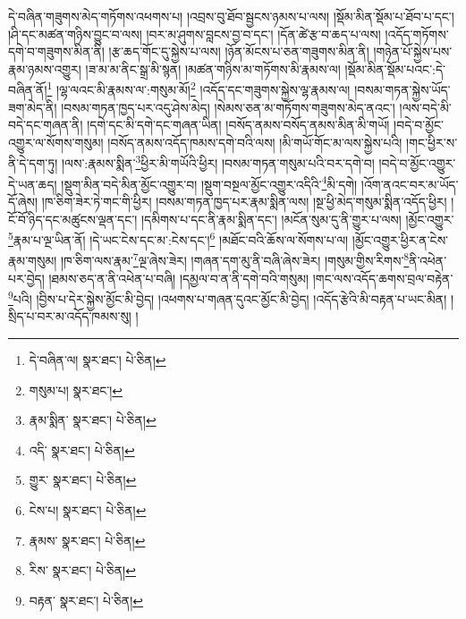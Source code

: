 དེ་བཞིན་གཟུགས་མེད་གཏོགས་འཕགས་པ། །འབྲས་བུ་ཐོབ་སྦྱངས་ཉམས་པ་ལས། །སྡོམ་མིན་སྡོམ་པ་ཐོབ་པ་དང་། །ཤི་དང་མཚན་གཉིས་བྱུང་བ་ལས། །བར་མ་ཤུགས་བླངས་བྱ་བ་དང་། །དོན་ཚེ་རྩ་བ་ཆད་པ་ལས། །འདོད་གཏོགས་དགེ་བ་གཟུགས་མིན་ནི། །རྩ་ཆད་གོང་དུ་སྐྱེས་པ་ལས། །ཉོན་མོངས་པ་ཅན་གཟུགས་མིན་ནི། །གཉེན་པོ་སྐྱེས་པས་རྣམ་ཉམས་འགྱུར། །ཟ་མ་མ་ནིང་སྒྲ་མི་སྙན། །མཚན་གཉིས་མ་གཏོགས་མི་རྣམས་ལ། །སྡོམ་མིན་སྡོམ་པའང་:དེ་བཞིན་ནོ།\footnote{དེ་བཞིན་ལ།  སྣར་ཐང་།  པེ་ཅིན། } །ལྷ་ལའང་མི་རྣམས་ལ་:གསུམ་མོ།\footnote{གསུམ་པ།  སྣར་ཐང་། } །འདོད་དང་གཟུགས་སྐྱེས་ལྷ་རྣམས་ལ། །བསམ་གཏན་སྐྱེས་ཡོད་ཟག་མེད་ནི། །བསམ་གཏན་ཁྱད་པར་འདུ་ཤེས་མེད། །སེམས་ཅན་མ་གཏོགས་གཟུགས་མེད་ནའང་། །ལས་བདེ་མི་བདེ་དང་གཞན་ནི། །དགེ་དང་མི་དགེ་དང་གཞན་ཡིན། །བསོད་ནམས་བསོད་ནམས་མིན་མི་གཡོ། །བདེ་བ་མྱོང་འགྱུར་ལ་སོགས་གསུམ། །བསོད་ནམས་འདོད་ཁམས་དགེ་བའི་ལས། །མི་གཡོ་གོང་མ་ལས་སྐྱེས་པའི། །གང་ཕྱིར་ས་ནི་དེ་དག་ཏུ། །ལས་:རྣམས་སྨིན་\footnote{རྣམ་སྨིན་  སྣར་ཐང་།  པེ་ཅིན། }ཕྱིར་མི་གཡོའི་ཕྱིར། །བསམ་གཏན་གསུམ་པའི་བར་དགེ་བ། །བདེ་བ་མྱོང་འགྱུར་དེ་ཡན་ཆད། །སྡུག་མིན་བདེ་མིན་མྱོང་འགྱུར་བ། །སྡུག་བསྔལ་མྱོང་འགྱུར་འདིའི་\footnote{འདི་  སྣར་ཐང་།  པེ་ཅིན། }མི་དགེ། །འོག་ནའང་བར་མ་ཡོད་དོ་ཞེས། །ཁ་ཅིག་ཟེར་ཏེ་གང་གི་ཕྱིར། །བསམ་གཏན་ཁྱད་པར་རྣམ་སྨིན་ལས། །སྔ་ཕྱི་མེད་གསུམ་སྨིན་འདོད་ཕྱིར། །ངོ་བོ་ཉིད་དང་མཚུངས་ལྡན་དང་། །དམིགས་པ་དང་ནི་རྣམ་སྨིན་དང་། །མངོན་སུམ་དུ་ནི་གྱུར་པ་ལས། །མྱོང་འགྱུར་\footnote{གྱུར་  སྣར་ཐང་།  པེ་ཅིན། }རྣམ་པ་ལྔ་ཡིན་ནོ། །དེ་ཡང་ངེས་དང་མ་:ངེས་དང་།\footnote{ངེས་པ།  སྣར་ཐང་།  པེ་ཅིན། } །མཐོང་བའི་ཆོས་ལ་སོགས་པ་ལ། །མྱོང་འགྱུར་ཕྱིར་ན་ངེས་རྣམ་གསུམ། །ཁ་ཅིག་ལས་རྣམ་\footnote{རྣམས་  སྣར་ཐང་།  པེ་ཅིན། }ལྔ་ཞེས་ཟེར། །གཞན་དག་མུ་ནི་བཞི་ཞེས་ཟེར། །གསུམ་གྱིས་རིགས་\footnote{རིས་  སྣར་ཐང་།  པེ་ཅིན། }ནི་འཕེན་པར་བྱེད། །ཐམས་ཅད་ན་ནི་འཕེན་པ་བཞི། །དམྱལ་བ་ན་ནི་དགེ་བའི་གསུམ། །གང་ལས་འདོད་ཆགས་བྲལ་བརྟེན་\footnote{བརྟན་  སྣར་ཐང་།  པེ་ཅིན། }པའི། །བྱིས་པ་དེར་སྐྱེས་མྱོང་མི་བྱེད། །འཕགས་པ་གཞན་དུའང་མྱོང་མི་བྱེད། །འདོད་རྩེའི་མི་བརྟན་པ་ཡང་མིན། །སྲིད་པ་བར་མ་འདོད་ཁམས་སུ། །
